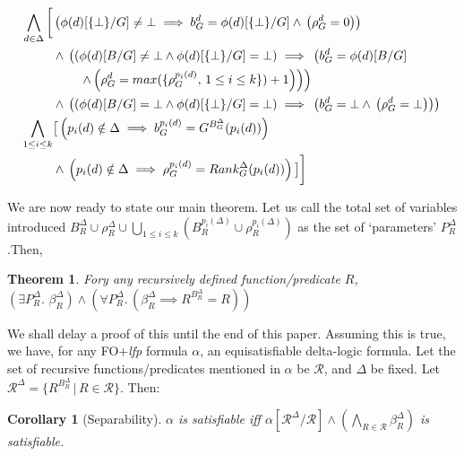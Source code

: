 \documentclass[12pt]{article} %
\newtheorem{theorem}{Theorem}
\newtheorem{corollary}{Corollary}
\begin{document}
\begin{align*}
\bigwedge\limits_{d \in{} \Delta} \bigg\lbrack{} & \left( \phi{}(d)[\{\bot{}\}/G] \neq{} \bot{} \implies{} b_{G}^{d} = \phi{}(d)[\{\bot{}\}/G] \land{} \left(\rho_{G}^{d} = 0\right) \right)\notag{}\\
&\land{}  \left( \left( \phi{}(d)[B/G] \neq{} \bot{} \land{} \phi{}(d)[\{\bot{}\}/G] = \bot{} \right) \implies{} \left( b_{G}^{d} = \phi{}(d)[B/G] \right.\right.\notag{}\\
&\qquad{} \left.\left. \land{} \left(\rho_{G}^{d} = max(\{\rho_{G}^{p_i(d)},\, 1 \leq{} i \leq{} k\}) + 1 \right)\right)  \right) \notag{}\\
& \land{}  \left( \left( \phi{}(d)[B/G] = \bot{} \land{} \phi{}(d)[\{\bot{}\}/G] = \bot{} \right) \implies{} \left( b_{G}^{d} = \bot{} \land{} \left(\rho_{G}^{d} = \bot{} \right)\right) \right) \notag{}\\
\bigwedge\limits_{1 \leq{} i \leq{} k} & \big\lbrack{} \left(p_i(d) \notin{} \Delta{} \implies{} b_{G}^{p_i(d)} =  G^{B_G^{\Delta}}(p_i(d)) \right) \notag{}\\
& \land{} \left(p_i(d) \notin{} \Delta{} \implies{} \rho_{G}^{p_i(d)} =  Rank_{G}^{\Delta}(p_i(d)) \right) \big\rbrack{} \bigg\rbrack{} \notag{} 
\end{align*}

We are now ready to state our main theorem. Let us call the total set of variables introduced $B_{R}^{\Delta} \cup{} \rho_{R}^{\Delta} \cup{} \bigcup\limits_{1 \leq{} i \leq{} k}\left( B_{R}^{p_i(\Delta)} \cup{} \rho_{R}^{p_i(\Delta)} \right)$ as the set of `parameters' $P_{R}^{\Delta}$.Then, 

\begin{theorem}
\label{relative_lfp}
Fory any recursively defined function/predicate $R$, $\left(\exists{}P_{R}^{\Delta}.\,\,\beta_{R}^{\Delta}\right) \land{} \left(\forall{}P_{R}^{\Delta}.\,\left(\beta_{R}^{\Delta} \implies{} R^{B_{R}^{\Delta}} = R\right) \right)$
\end{theorem}

We shall delay a proof of this until the end of this paper. Assuming this is true, we have, for any FO+\textit{lfp} formula $\alpha$, an equisatisfiable delta-logic formula. Let the set of recursive functions/predicates mentioned in $\alpha{}$ be $\mathcal{R}$, and $\Delta{}$ be fixed. Let $\mathcal{R}^{\Delta} = \{ R^{B_{R}^{\Delta}} \,|\, R \in{} \mathcal{R}\}$. Then:\\

\begin{corollary}[Separability]
$\alpha{}$ is satisfiable iff  $\alpha[\mathcal{R}^{\Delta}/\mathcal{R}] \land{} \left( \bigwedge\limits_{R \in{} \mathcal{R}} \beta_{R}^{\Delta}\right)$ is satisfiable.
\end{corollary}
\end{document}
